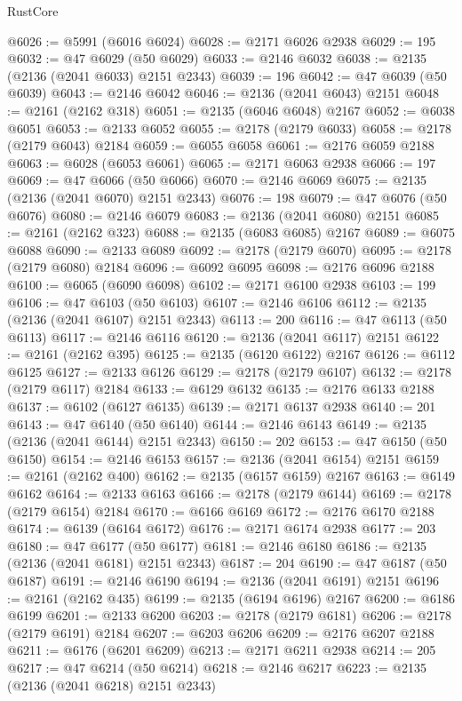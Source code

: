 \begin{lexlean}{RustCore}
\begin{coremodule}
@6026 := @5991 (@6016 @6024)
@6028 := @2171 @6026 @2938
@6029 := 195
@6032 := @47 @6029 (@50 @6029)
@6033 := @2146 @6032
@6038 := @2135 (@2136 (@2041 @6033) @2151 @2343)
@6039 := 196
@6042 := @47 @6039 (@50 @6039)
@6043 := @2146 @6042
@6046 := @2136 (@2041 @6043) @2151
@6048 := @2161 (@2162 @318)
@6051 := @2135 (@6046 @6048) @2167
@6052 := @6038 @6051
@6053 := @2133 @6052
@6055 := @2178 (@2179 @6033)
@6058 := @2178 (@2179 @6043) @2184
@6059 := @6055 @6058
@6061 := @2176 @6059 @2188
@6063 := @6028 (@6053 @6061)
@6065 := @2171 @6063 @2938
@6066 := 197
@6069 := @47 @6066 (@50 @6066)
@6070 := @2146 @6069
@6075 := @2135 (@2136 (@2041 @6070) @2151 @2343)
@6076 := 198
@6079 := @47 @6076 (@50 @6076)
@6080 := @2146 @6079
@6083 := @2136 (@2041 @6080) @2151
@6085 := @2161 (@2162 @323)
@6088 := @2135 (@6083 @6085) @2167
@6089 := @6075 @6088
@6090 := @2133 @6089
@6092 := @2178 (@2179 @6070)
@6095 := @2178 (@2179 @6080) @2184
@6096 := @6092 @6095
@6098 := @2176 @6096 @2188
@6100 := @6065 (@6090 @6098)
@6102 := @2171 @6100 @2938
@6103 := 199
@6106 := @47 @6103 (@50 @6103)
@6107 := @2146 @6106
@6112 := @2135 (@2136 (@2041 @6107) @2151 @2343)
@6113 := 200
@6116 := @47 @6113 (@50 @6113)
@6117 := @2146 @6116
@6120 := @2136 (@2041 @6117) @2151
@6122 := @2161 (@2162 @395)
@6125 := @2135 (@6120 @6122) @2167
@6126 := @6112 @6125
@6127 := @2133 @6126
@6129 := @2178 (@2179 @6107)
@6132 := @2178 (@2179 @6117) @2184
@6133 := @6129 @6132
@6135 := @2176 @6133 @2188
@6137 := @6102 (@6127 @6135)
@6139 := @2171 @6137 @2938
@6140 := 201
@6143 := @47 @6140 (@50 @6140)
@6144 := @2146 @6143
@6149 := @2135 (@2136 (@2041 @6144) @2151 @2343)
@6150 := 202
@6153 := @47 @6150 (@50 @6150)
@6154 := @2146 @6153
@6157 := @2136 (@2041 @6154) @2151
@6159 := @2161 (@2162 @400)
@6162 := @2135 (@6157 @6159) @2167
@6163 := @6149 @6162
@6164 := @2133 @6163
@6166 := @2178 (@2179 @6144)
@6169 := @2178 (@2179 @6154) @2184
@6170 := @6166 @6169
@6172 := @2176 @6170 @2188
@6174 := @6139 (@6164 @6172)
@6176 := @2171 @6174 @2938
@6177 := 203
@6180 := @47 @6177 (@50 @6177)
@6181 := @2146 @6180
@6186 := @2135 (@2136 (@2041 @6181) @2151 @2343)
@6187 := 204
@6190 := @47 @6187 (@50 @6187)
@6191 := @2146 @6190
@6194 := @2136 (@2041 @6191) @2151
@6196 := @2161 (@2162 @435)
@6199 := @2135 (@6194 @6196) @2167
@6200 := @6186 @6199
@6201 := @2133 @6200
@6203 := @2178 (@2179 @6181)
@6206 := @2178 (@2179 @6191) @2184
@6207 := @6203 @6206
@6209 := @2176 @6207 @2188
@6211 := @6176 (@6201 @6209)
@6213 := @2171 @6211 @2938
@6214 := 205
@6217 := @47 @6214 (@50 @6214)
@6218 := @2146 @6217
@6223 := @2135 (@2136 (@2041 @6218) @2151 @2343)

\end{coremodule}
\end{lexlean}
